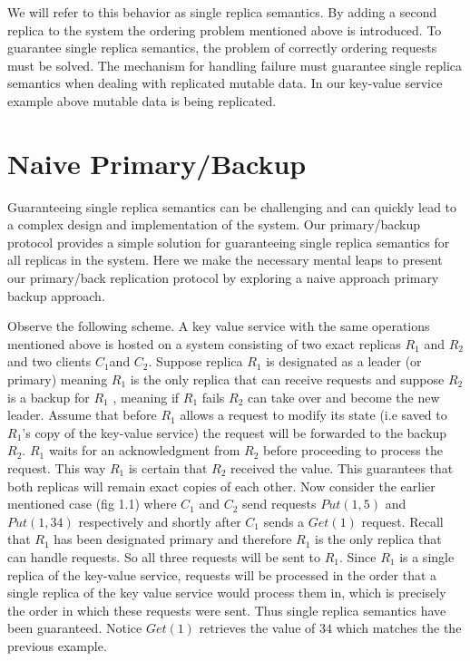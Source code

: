 \documentclass[conference]{IEEEtran}
\begin{document}
We will refer to this behavior as single replica semantics. By adding a second replica to the system the ordering problem mentioned above is introduced. To guarantee single replica semantics, the problem of correctly ordering requests must be solved. The mechanism for handling failure must guarantee single replica semantics when dealing with replicated mutable data. In our key-value service example above mutable data is being replicated.

\section{Naive Primary/Backup}
Guaranteeing single replica semantics can be  challenging and can quickly lead to a complex design and implementation of the system. Our primary/backup protocol provides a simple solution for guaranteeing single replica semantics for all replicas in the system. Here we make the necessary mental leaps to present our primary/back replication protocol by exploring a naive approach primary backup approach.

Observe the following scheme. A key value service with the same operations mentioned above is hosted on a system consisting of two exact replicas 
\(R_1\) and \(R_2\) and two clients \(C_1 \)and \(C_2\). Suppose replica \(R_1\) is designated as a leader (or primary) meaning \(R_1\) is the only replica that can receive requests and suppose \(R_2\) is a backup for \(R_1\) , meaning if \(R_1\) fails \(R_2\) can take over and become the new leader. Assume that before \( R_1\) allows a request to modify its state (i.e saved to \(R_1\)’s copy of the key-value service) the request will be forwarded to the backup \(R_2\). \(R_1\) waits for an acknowledgment from \(R_2\) before proceeding to process the request. This way \(R_1\) is certain that \(R_2\) received the value. This guarantees that both replicas will remain exact copies of each other. Now consider the earlier mentioned case (fig 1.1) where \(C_1\)  and \(C_2\) send requests \(Put(1, 5)\) and \(Put(1, 34)\) respectively and shortly after \(C_1\) sends a \(Get(1)\) request. Recall that \(R_1\) has been designated primary and therefore \(R_1\) is the only replica that can handle requests. So all three requests will be sent to \(R_1\). Since \(R_1\) is a single replica of the key-value service, requests will be processed in the order that a single replica of the key value service would process them in, which is precisely the order in which these requests were sent. Thus single replica semantics have been guaranteed. Notice \(Get(1)\) retrieves the value of \(34\) which matches the the previous example. 
\end{document}
